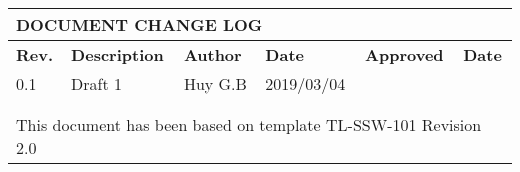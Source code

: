\begin{center}
\setlength{\extrarowheight}{5pt}
\begin{tabular}{|m{1cm}|m{4cm}|m{2.5cm}|m{2cm}|m{2.5cm}|m{2cm}|} 
 \hline
 \multicolumn{6}{|m{17cm}|}{\cellcolor{red!25} \Large \textbf{DOCUMENT CHANGE LOG}}
 \\
 \hline
\centering \textbf{Rev.} & \centering \textbf{Description} & \centering \textbf{Author} & \centering \textbf{Date} & \centering \textbf{Approved} & \textbf{Date} \\
 \hline
 0.1 & Draft 1 & Huy G.B & 2019/03/04
 & & \\
 \hline
 &  &  &  & & \\
 \hline
 &  &  &  & & \\
 \hline
 \multicolumn{6}{|m{17cm}|}{\cellcolor{red!25} This document has been based on template TL-SSW-101 Revision 2.0}
 \\
 \hline
\end{tabular}
\end{center}
\newpage